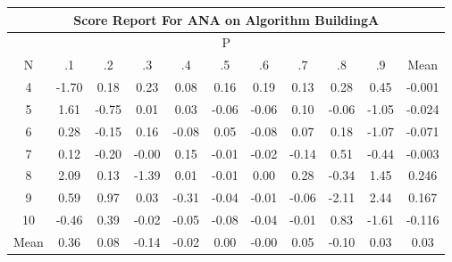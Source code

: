 \documentclass[11pt,a4paper]{report}
\begin{document}
\begin{longtable}{ | c || c | c | c | c | c | c | c | c | c || c |}
\hline
\multicolumn{11}{|c|}{ Score Report For ANA on Algorithm BuildingA} \\
\hline
\multicolumn{11}{|c|}{ P } \\
\hline
N & .1 & .2 & .3 & .4 & .5 & .6 & .7 & .8 & .9 & Mean\\
 \hline
 \hline
 \endhead
  4 &  \cellcolor[HTML]{FFD7D7} -1.70 &  \cellcolor[HTML]{F7F7FF} 0.18 &  \cellcolor[HTML]{F7F7FF} 0.23 &  \cellcolor[HTML]{FFFFFF} 0.08 &  \cellcolor[HTML]{FFFFFF} 0.16 &  \cellcolor[HTML]{F7F7FF} 0.19 &  \cellcolor[HTML]{FFFFFF} 0.13 &  \cellcolor[HTML]{F7F7FF} 0.28 &  \cellcolor[HTML]{F7F7FF} 0.45 & -0.001 \\
  5 &  \cellcolor[HTML]{D7D7FF} 1.61 &  \cellcolor[HTML]{FFEFEF} -0.75 &  \cellcolor[HTML]{FFFFFF} 0.01 &  \cellcolor[HTML]{FFFFFF} 0.03 &  \cellcolor[HTML]{FFFFFF} -0.06 &  \cellcolor[HTML]{FFFFFF} -0.06 &  \cellcolor[HTML]{FFFFFF} 0.10 &  \cellcolor[HTML]{FFFFFF} -0.06 &  \cellcolor[HTML]{FFE7E7} -1.05 & -0.024 \\
  6 &  \cellcolor[HTML]{F7F7FF} 0.28 &  \cellcolor[HTML]{FFFFFF} -0.15 &  \cellcolor[HTML]{F7F7FF} 0.16 &  \cellcolor[HTML]{FFFFFF} -0.08 &  \cellcolor[HTML]{FFFFFF} 0.05 &  \cellcolor[HTML]{FFFFFF} -0.08 &  \cellcolor[HTML]{FFFFFF} 0.07 &  \cellcolor[HTML]{F7F7FF} 0.18 &  \cellcolor[HTML]{FFE7E7} -1.07 & -0.071 \\
  7 &  \cellcolor[HTML]{FFFFFF} 0.12 &  \cellcolor[HTML]{FFF7F7} -0.20 &  \cellcolor[HTML]{FFFFFF} -0.00 &  \cellcolor[HTML]{FFFFFF} 0.15 &  \cellcolor[HTML]{FFFFFF} -0.01 &  \cellcolor[HTML]{FFFFFF} -0.02 &  \cellcolor[HTML]{FFFFFF} -0.14 &  \cellcolor[HTML]{EFEFFF} 0.51 &  \cellcolor[HTML]{FFF7F7} -0.44 & -0.003 \\
  8 &  \cellcolor[HTML]{C7C7FF} 2.09 &  \cellcolor[HTML]{FFFFFF} 0.13 &  \cellcolor[HTML]{FFDFDF} -1.39 &  \cellcolor[HTML]{FFFFFF} 0.01 &  \cellcolor[HTML]{FFFFFF} -0.01 &  \cellcolor[HTML]{FFFFFF} 0.00 &  \cellcolor[HTML]{F7F7FF} 0.28 &  \cellcolor[HTML]{FFF7F7} -0.34 &  \cellcolor[HTML]{D7D7FF} 1.45 & 0.246 \\
  9 &  \cellcolor[HTML]{EFEFFF} 0.59 &  \cellcolor[HTML]{E7E7FF} 0.97 &  \cellcolor[HTML]{FFFFFF} 0.03 &  \cellcolor[HTML]{FFF7F7} -0.31 &  \cellcolor[HTML]{FFFFFF} -0.04 &  \cellcolor[HTML]{FFFFFF} -0.01 &  \cellcolor[HTML]{FFFFFF} -0.06 &  \cellcolor[HTML]{FFC7C7} -2.11 &  \cellcolor[HTML]{BFBFFF} 2.44 & 0.167 \\
  10 &  \cellcolor[HTML]{FFF7F7} -0.46 &  \cellcolor[HTML]{F7F7FF} 0.39 &  \cellcolor[HTML]{FFFFFF} -0.02 &  \cellcolor[HTML]{FFFFFF} -0.05 &  \cellcolor[HTML]{FFFFFF} -0.08 &  \cellcolor[HTML]{FFFFFF} -0.04 &  \cellcolor[HTML]{FFFFFF} -0.01 &  \cellcolor[HTML]{E7E7FF} 0.83 &  \cellcolor[HTML]{FFD7D7} -1.61 & -0.116 \\
 \hline
 \hline
Mean &  \cellcolor[HTML]{F7F7FF} 0.36 &  \cellcolor[HTML]{FFFFFF} 0.08 &  \cellcolor[HTML]{FFFFFF} -0.14 &  \cellcolor[HTML]{FFFFFF} -0.02 &  \cellcolor[HTML]{FFFFFF} 0.00 &  \cellcolor[HTML]{FFFFFF} -0.00 &  \cellcolor[HTML]{FFFFFF} 0.05 &  \cellcolor[HTML]{FFFFFF} -0.10 &  \cellcolor[HTML]{FFFFFF} 0.03 &  \cellcolor[HTML]{FFFFFF} 0.03
\end{longtable}
\end{document}
